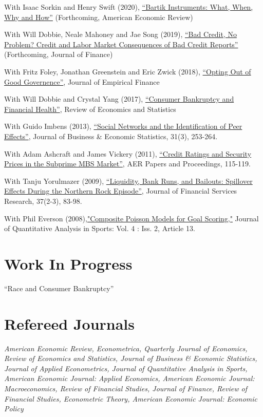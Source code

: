 \documentclass[letterpaper]{article}
\renewenvironment{itemize}{
  \begin{list}{}
    { \setlength{\itemsep}{5pt}
      \setlength{\parsep}{0pt}
      \setlength{\topsep}{0pt}
      \setlength{\leftmargin}{0em} } }{
  \end{list}}
\begin{document}
\begin{itemize}
\item With Isaac Sorkin and Henry Swift (2020), \href{http://paulgp.github.io/papers/bartik_gpss.pdf}{``Bartik Instruments: What, When, Why and How''} (Forthcoming, American Economic Review)
\item With Will Dobbie, Neale Mahoney and Jae Song (2019), \href{https://papers.ssrn.com/sol3/papers.cfm?abstract_id=2844316}{``Bad Credit, No Problem? Credit and Labor Market Consequences of Bad Credit Reports''} (Forthcoming, Journal of Finance)
\item With Fritz Foley, Jonathan Greenstein and Eric Zwick (2018), \href{http://www.nber.org/papers/w19953}{``Opting Out of Good Governence''}, Journal of Empirical Finance
\item With Will Dobbie and Crystal Yang (2017), \href{http://www.nber.org/papers/w21032}{``Consumer Bankruptcy and Financial Health''}, Review of Economics and Statistics
\item With Guido Imbens (2013), \href{http://www.tandfonline.com/doi/pdf/10.1080/07350015.2013.801251}{``Social Networks and the Identification of Peer Effects''}, Journal of Business \& Economic Statistics, 31(3), 253-264.
\item With Adam Ashcraft and James Vickery (2011), \href{http://papers.ssrn.com.ezp-prod1.hul.harvard.edu/sol3/papers.cfm?abstract_id=1856823}{``Credit Ratings
    and Security Prices in the Subprime MBS Market''}, AER Papers and Proceedings,  115-119. 
\item With Tanju Yorulmazer (2009), \href{http://www.springerlink.com/content/ww187761jgr660q5/}{``Liquidity, Bank Runs, and Bailouts: Spillover Effects During the Northern Rock Episode''}, Journal of Financial Services Research, 37(2-3), 83-98. 
\item With Phil Everson (2008),\href{http://www.bepress.com/jqas/vol4/iss2/13/}{"Composite Poisson Models for Goal Scoring,"} Journal of Quantitative Analysis in Sports: Vol. 4 : Iss. 2, Article 13.
\end{itemize}


\section*{Work In Progress}
\begin{itemize}
\item ``Race and Consumer Bankruptcy'' 
\end{itemize}


\section*{Refereed Journals}
\textit{American Economic Review, Econometrica, Quarterly Journal of Economics, Review of Economics and Statistics, Journal of Business \& Economic Statistics, Journal of Applied Econometrics, Journal of Quantitative Analysis in Sports, American Economic Journal: Applied Economics, American Economic Journal: Macroeconomics, Review of Financial Studies, Journal of Finance, Review of Financial Studies, Econometric Theory, American Economic Journal: Economic Policy}
\end{document}
